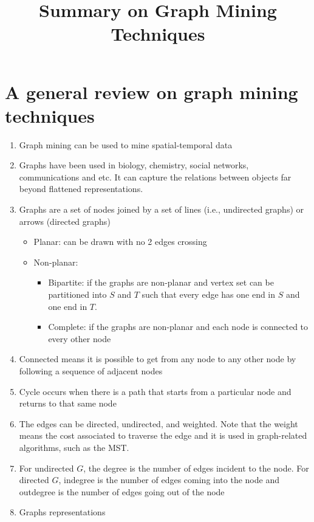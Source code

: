 \documentclass[14pt]{article}
\begin{document}
\title{Summary on Graph Mining Techniques}
\maketitle

\section{A general review on graph mining techniques}
\begin{enumerate}
 \item Graph mining can be used to mine spatial-temporal data
 \item Graphs have been used in biology, chemistry, social networks, communications and etc. It can capture the relations between objects far beyond flattened representations.
 \item Graphs are a set of nodes joined by a set of lines (i.e., undirected graphs) or arrows (directed graphs)
  \begin{itemize}
   \item Planar: can be drawn with no 2 edges crossing
   \item Non-planar:
    \begin{itemize}
     \item Bipartite: if the graphs are non-planar and vertex set can be partitioned into $S$ and $T$ such that every edge has one end in $S$ and one end in $T$.
     \item Complete: if the graphs are non-planar and each node is connected to every other node
    \end{itemize}
  \end{itemize}
 \item Connected means it is possible to get from any node to any other node by following a sequence of adjacent nodes
 \item Cycle occurs when there is a path that starts from a particular node and returns to that same node
 \item The edges can be directed, undirected, and weighted. Note that the weight means the cost associated to traverse the edge and it is used in graph-related algorithms, such as the MST.
 \item For undirected $G$, the degree is the number of edges incident to the node. For directed $G$, indegree is the number of edges coming into the node and outdegree is the number of edges going out of the node
 \item Graphs representations
  \begin{itemize}

\end{itemize}
\end{enumerate}
\end{document}
